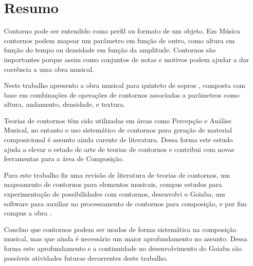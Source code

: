 \chapter*{Resumo}
\label{cha:resumo}

Contorno pode ser entendido como perfil ou formato de um objeto. Em
Música contornos podem mapear um parâmetro em função de outro, como
altura em função do tempo ou densidade em função da
amplitude. Contornos são importantes porque assim como conjuntos de
notas e motivos podem ajudar a dar coerência a uma obra musical.

Neste trabalho apresento a obra musical para quinteto de sopros
\obra{}, composta com base em combinações de operações de contornos
associadas a parâmetros como altura, andamento, densidade, e textura.

Teorias de contornos têm sido utilizadas em áreas como Percepção e
Análise Musical, no entanto o uso sistemático de contornos para
geração de material composicional é assunto ainda carente de
literatura. Dessa forma este estudo ajuda a elevar o estado de arte de
teorias de contornos e contribui com novas ferramentas para a área de
Composição.

Para este trabalho fiz uma revisão de literatura de teorias de
contornos, um mapeamento de contornos para elementos musicais, compus
estudos para experimentação de possibilidades com contornos,
desenvolvi o Goiaba, um software para auxiliar no processamento de
contornos para composição, e por fim compus a obra \obra{}.

Concluo que contornos podem ser usados de forma sistemática na
composição musical, mas que ainda é necessário um maior aprofundamento
no assunto. Dessa forma este aprofundamento e a continuidade no
desenvolvimento do Goiaba são possíveis atividades futuras decorrentes
deste trabalho.

